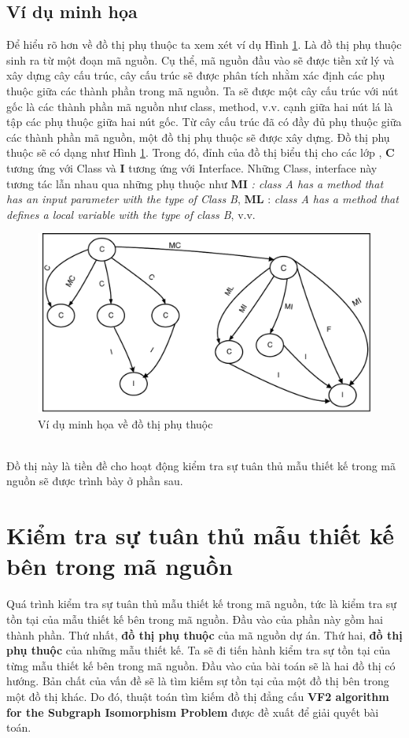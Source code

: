\documentclass[12pt]{report}
\begin{document}
\subsection{Ví dụ minh họa}
\noindent Để hiểu rõ hơn về đồ thị phụ thuộc ta xem xét ví dụ Hình \ref{fig:example_graph_dependency}. Là đồ thị phụ thuộc sinh ra từ một đoạn mã nguồn. Cụ thể, mã nguồn đầu vào sẽ được tiền xử lý và xây dựng cây cấu trúc, cây cấu trúc sẽ được phân tích nhằm xác định các phụ thuộc giữa các thành phần trong mã nguồn. Ta sẽ được một cây cấu trúc với nút gốc là các thành phần mã nguồn như class, method, v.v. cạnh giữa hai nút lá là tập các phụ thuộc giữa hai nút gốc. Từ cây cấu trúc đã có đầy đủ phụ thuộc giữa các thành phần mã nguồn, một đồ thị phụ thuộc sẽ được xây dựng. Đồ thị phụ thuộc sẽ có dạng như Hình \ref{fig:example_graph_dependency}.
Trong đó, đỉnh của đồ thị biểu thị cho các lớp , \textbf{C} tương ứng với Class và \textbf{I} tương ứng với Interface. Những Class, interface này tương tác lẫn nhau qua những phụ thuộc như \textbf{MI} \textit{: class A has a method that has an input parameter with the type of Class B}, \textbf{ML} : \textit{class A has a method that defines a local variable with the type of class B}, v.v.\\
\begin{figure}[!htbp]
	\centering
	\vspace{0cm}
	\includegraphics[scale=0.9]{images/dependency_graph.pdf}
	\caption{Ví dụ minh họa về đồ thị phụ thuộc}
	\label{fig:example_graph_dependency}
\end{figure}\\
Đồ thị này là tiền đề cho hoạt động kiểm tra sự tuân thủ mẫu thiết kế trong mã nguồn sẽ được trình bày ở phần sau.
\section{Kiểm tra sự tuân thủ mẫu thiết kế bên trong mã nguồn}
Quá trình kiểm tra sự tuân thủ mẫu thiết kế trong mã nguồn, tức là kiểm tra sự tồn tại của mẫu thiết kế bên trong mã nguồn. Đầu vào của phần này gồm hai thành phần. Thứ nhất, \textbf{đồ thị phụ thuộc} của mã nguồn dự án. Thứ hai, \textbf{đồ thị phụ thuộc} của những mẫu thiết kế. Ta sẽ đi tiến hành kiểm tra sự tồn tại của từng mẫu thiết kế bên trong mã nguồn. 
Đầu vào của bài toán sẽ là hai đồ thị có hướng. Bản chất của vấn đề sẽ là tìm kiếm sự tồn tại của một đồ thị bên trong một đồ thị khác. Do đó, thuật toán tìm kiếm đồ thị đẳng cấu \textbf{VF2 algorithm for the Subgraph Isomorphism Problem} được đề xuất để giải quyết bài toán.
\end{document}
